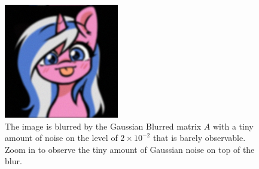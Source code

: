 \documentclass[]{article}
\theoremstyle{definition}
\begin{document}
        \begin{figure}[H]
            \centering
            \includegraphics*[width=5cm]{blurred_img.jpg}
            \caption{The image is blurred by the Gaussian Blurred matrix $A$ with a tiny amount of noise on the level of $2\times 10^{-2}$ that is barely observable. Zoom in to observe the tiny amount of Gaussian noise on top of the blur.}
            \label{fig:blurred_alto}
        \end{figure}
\end{document}
